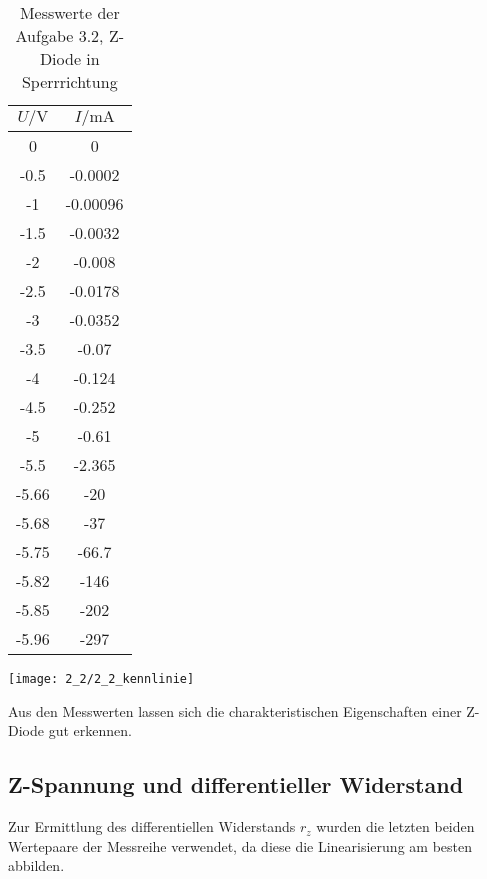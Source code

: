 \documentclass[a4paper, 12pt]{article}
\begin{document}
\begin{multicols}{2}
\begin{center}
  \begin{table}[H]
\begin{center}
\begin{tabular}{@{}c|c@{}}
\toprule
$U / \si{\volt}$     & $I / \si{\milli\ampere}$        \\ \midrule
0     & 0        \\
-0.5  & -0.0002  \\
-1    & -0.00096 \\
-1.5  & -0.0032  \\
-2    & -0.008   \\
-2.5  & -0.0178  \\
-3    & -0.0352  \\
-3.5  & -0.07    \\
-4    & -0.124   \\
-4.5  & -0.252   \\
-5    & -0.61    \\
-5.5  & -2.365   \\
-5.66 & -20      \\
-5.68 & -37      \\
-5.75 & -66.7    \\
-5.82 & -146     \\
-5.85 & -202     \\
-5.96 & -297     \\ \bottomrule
\end{tabular}
\end{center}
\caption{Messwerte der Aufgabe 3.2, Z-Diode in Sperrrichtung}
\end{table}

\end{center}
\end{multicols}



\begin{center}
 \texttt{[image: 2\_2/2\_2\_kennlinie]}
\end{center}

Aus den Messwerten lassen sich die charakteristischen Eigenschaften einer
Z-Diode gut erkennen.

\subsection{Z-Spannung und differentieller Widerstand}

Zur Ermittlung des differentiellen Widerstands $r_z$ wurden die letzten beiden
Wertepaare der Messreihe verwendet, da diese die Linearisierung am besten
abbilden.
\end{document}
